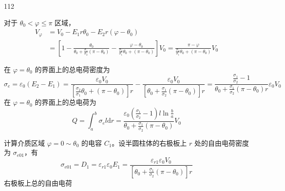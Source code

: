 \begin{solution}{112}
\begin{subsolution}
        对于 $\theta_0 < \varphi \leq \pi$ 区域，
        \begin{equation}
            \begin{aligned}
                V_{\varphi} &= V_{0} - E_{1} r \theta_{0} - E_{2} r (\varphi - \theta_{0}) \\
                &= \left[ 1 - \frac{\theta_{0}}{\theta_{0} + \frac{\sigma_{1}}{\sigma_{2}} (\pi - \theta_{0})} - \frac{\varphi - \theta_{0}}{\frac{\sigma_{2}}{\sigma_{1}} \theta_{0} + (\pi - \theta_{0})} \right] V_{0} = \frac{\pi - \varphi}{\frac{\sigma_{2}}{\sigma_{1}} \theta_{0} + (\pi - \theta_{0})} V_{0}
            \end{aligned}
            \label{eq:6.s112}
        \end{equation}
    \end{subsolution}
    \begin{subsolution}
        在 $\varphi = \theta_0$ 的界面上的总电荷密度为
        \begin{equation}
            \sigma_{e} = \varepsilon_{0} \left(E_{2} - E_{1}\right) = \frac{\varepsilon_{0} V_{0}}{\left[ \frac{\sigma_{2}}{\sigma_{1}} \theta_{0} + (\pi - \theta_{0}) \right] r} - \frac{\varepsilon_{0} V_{0}}{\left[ \theta_{0} + \frac{\sigma_{1}}{\sigma_{2}} (\pi - \theta_{0}) \right] r} = \frac{\frac{\sigma_{1}}{\sigma_{2}} - 1}{\theta_{0} + \frac{\sigma_{1}}{\sigma_{2}} (\pi - \theta_{0}) r} \varepsilon_{0} V_{0}
            \label{eq:7.s112}
        \end{equation}
        在 $\varphi = \theta_0$ 的界面上的总电荷为
        \begin{equation}
            Q = \int_{a}^{b} \sigma_{e} l \mathrm{d} r = \frac{\varepsilon_{0} (\frac{\sigma_{1}}{\sigma_{2}} - 1) l \ln \frac{b}{a}}{\theta_{0} + \frac{\sigma_{1}}{\sigma_{2}} (\pi - \theta_{0})} V_{0}
            \label{eq:8.s112}
        \end{equation}
    \end{subsolution}
    \begin{subsolution}
        计算介质区域 $\varphi=0\sim\theta_{0}$ 的电容 $C_{1}$。设半圆柱体的右极板上 $r$ 处的自由电荷密度为 $\sigma_{e01}$，有
        \begin{equation}
            \sigma_{e01} = D_{1} = \varepsilon_{r1} \varepsilon_{0} E_{1} = \frac{\varepsilon_{r1} \varepsilon_{0} V_{0}}{\left[ \theta_{0} + \frac{\sigma_{1}}{\sigma_{2}} (\pi - \theta_{0}) \right] r}
            \label{eq:9.s112}
        \end{equation}
        右极板上总的自由电荷
        \begin{equation}

\end{equation}
\end{subsolution}
\end{solution}

